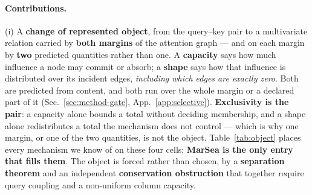 \documentclass{article}
\begin{document}
\paragraph{Contributions.} (i) A \textbf{change of represented object}, from the query--key pair
to a multivariate relation carried by \textbf{both margins} of the attention graph --- and on each
margin by \textbf{two} predicted quantities rather than one. A \textbf{capacity} says how much
influence a node may commit or absorb; a \textbf{shape} says how that influence is distributed
over its incident edges, \emph{including which edges are exactly zero}. Both are predicted from
content, and both run over the whole margin or a declared part of it
(Sec.~\ref{sec:method-gate}, App.~\ref{app:selective}). \textbf{Exclusivity is the pair}: a
capacity alone bounds a total without deciding membership, and a shape alone redistributes a total
the mechanism does not control --- which is why one margin, or one of the two quantities, is not
the object. Table~\ref{tab:object} places every mechanism we know of on these four cells;
\textbf{MarSea is the only entry that fills them}. The object is forced rather than chosen, by a
\textbf{separation theorem} and an independent \textbf{conservation obstruction} that together
require query coupling and a non-uniform column capacity.
\end{document}
